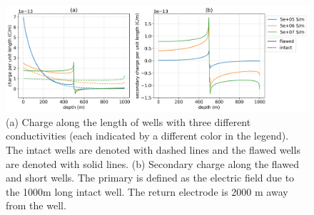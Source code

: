 \begin{figure}
    \begin{center}
    \includegraphics[width=\textwidth]{figures/casing_charge_sigma_casing.png}
    \end{center}
\caption{
    (a) Charge along the length of wells with three different
    conductivities (each indicated by a different color in the legend).
    The intact wells are denoted with dashed lines and the flawed wells
    are denoted with solid lines.
    (b) Secondary charge along the flawed and short wells. The primary is
    defined as the electric field due to the 1000m long intact well. The return electrode
    is 2000 m away from the well.
}
\label{fig:casing_charge_sigma_casing}
\end{figure}
